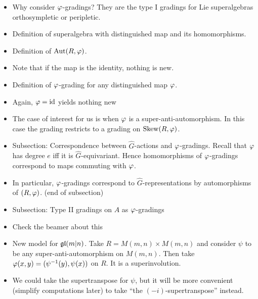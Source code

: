 \documentclass{amsbook}
\newcommand{\cmark}{\ding{51}}%
\newcommand{\done}{\rlap{\raisebox{1pt}{\large\hspace{-5pt}\cmark}}}
\begin{document}
    \begin{itemize}
        \item[\done] Why consider $\varphi$-gradings? They are the type I gradings for Lie superalgebras orthosympletic or peripletic. 
        
        \item[\done] Definition of superalgebra with distinguished map and its homomorphisms. 
        
        \item[\done] Definition of $\operatorname{Aut} (R, \varphi)$. 
        
        \item[\done] Note that if the map is the identity, nothing is new. 
        
        \item[\done] Definition of $\varphi$-grading for any distinguished map $\varphi$. 
        
        \item[\done] Again, $\varphi = \operatorname{id}$ yields nothing new
        
        \item[\done] The case of interest for us is when $\varphi$ is a super-anti-automorphism. In this case the grading restricts to a grading on $\operatorname{Skew}(R, \varphi)$. 
        
        \item[\done] Subsection: Correspondence between $\widehat G$-actions and $\varphi$-gradings. Recall that $\varphi$ has degree $e$ iff it is $\widehat G$-equivariant. Hence homomorphisms of $\varphi$-gradings correspond to maps commuting with $\varphi$.
        
        \item[\done] In particular, $\varphi$-gradings correspond to $\widehat G$-representations by automorphisms of $(R, \varphi)$. (end of subsection)
        
        \item[\done] Subsection: Type II gradings on $A$ as $\varphi$-gradings
        
        \item[\done] Check the beamer about this
        
        \item[\done] New model for $\mathfrak{gl}(m|n)$. Take $R = M(m,n) \times M(m,n)$ and consider $\psi$ to be any super-anti-automorphism on $M(m,n)$. Then take $\varphi (x, y) = (\psi^{-1} (y) , \psi (x) )$ on $R$. It is a superinvolution.
        
        \item[\done] We could take the supertranspose for $\psi$, but it will be more convenient (simplify computations later) to take ``the $(-i)$-supertranspose'' instead.
        

\end{itemize}
\end{document}
